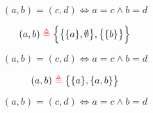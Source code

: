 
\begin{frame}{}
  \begin{definition}
    \[
      (a, b) = (c, d) \iff a = c \land b = d
    \]
  \end{definition}
\end{frame}

\begin{frame}{}
  \begin{definition}
    \[
      (a, b) \;\textcolor{red}{\triangleq}\; \Big\{\big\{\{a\}, \emptyset\big\}, \big\{\{b\}\big\}\Big\}
    \]
  \end{definition}


  \pause
  \begin{theorem}
    \[
      (a, b) = (c, d) \iff a = c \land b = d
    \]
  \end{theorem}
\end{frame}

\begin{frame}{}
  \begin{definition}
    \[
      (a, b) \;\textcolor{red}{\triangleq}\; \big\{\{a\}, \{a, b\}\big\}
    \]
  \end{definition}


  \pause
  \begin{theorem}
    \[
      (a, b) = (c, d) \iff a = c \land b = d
    \]
  \end{theorem}
\end{frame}

